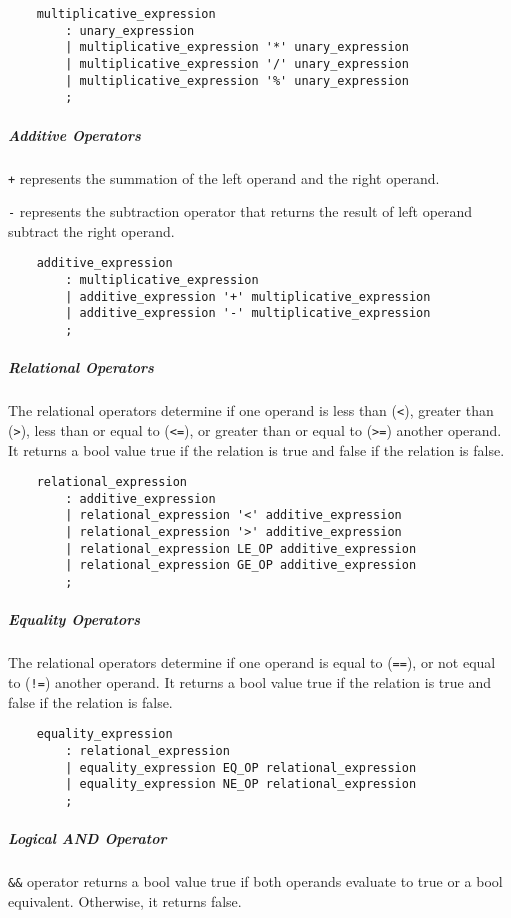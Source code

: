 \begin{verbatim}
    multiplicative_expression
        : unary_expression
        | multiplicative_expression '*' unary_expression
        | multiplicative_expression '/' unary_expression
        | multiplicative_expression '%' unary_expression
        ;
\end{verbatim}

\subparagraph{Additive Operators}
\verb"+" represents the summation of the left operand and the right operand.

\verb"-" represents the subtraction operator that returns the result of left operand subtract the right
operand.

\begin{verbatim}
    additive_expression
        : multiplicative_expression
        | additive_expression '+' multiplicative_expression
        | additive_expression '-' multiplicative_expression
        ;
\end{verbatim}

\subparagraph{Relational Operators}
The relational operators determine if one operand is less than (\verb"<"), greater than (\verb">"),
less than or equal to (\verb"<="), or greater than or equal to (\verb">=") another operand. It
returns a bool value true if the relation is true and false if the relation is false.

\begin{verbatim}
    relational_expression
        : additive_expression
        | relational_expression '<' additive_expression
        | relational_expression '>' additive_expression
        | relational_expression LE_OP additive_expression
        | relational_expression GE_OP additive_expression
        ;
\end{verbatim}

\subparagraph{Equality Operators}
The relational operators determine if one operand is equal to (\verb"=="), or not equal to
(\verb"!=") another operand. It returns a bool value true if the relation is true and false if the
relation is false.

\begin{verbatim}
    equality_expression
        : relational_expression
        | equality_expression EQ_OP relational_expression
        | equality_expression NE_OP relational_expression
        ;
\end{verbatim}

\subparagraph{Logical AND Operator}
\verb"&&" operator returns a bool value true if both operands evaluate to true or a bool equivalent.
Otherwise, it returns false.

